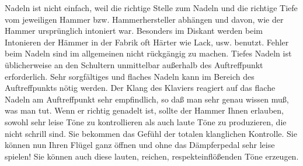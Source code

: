 %
%

Nadeln ist nicht einfach, weil die richtige Stelle zum Nadeln und die richtige Tiefe vom jeweiligen Hammer bzw. Hammerhersteller abhängen und davon, wie der Hammer ursprünglich intoniert war.
Besonders im Diskant werden beim Intonieren der Hämmer in der Fabrik oft Härter wie Lack, usw. benutzt.
Fehler beim Nadeln sind im allgemeinen nicht rückgängig zu machen.
Tiefes Nadeln ist üblicherweise an den Schultern unmittelbar außerhalb des Auftreffpunkt erforderlich.
Sehr sorgfältiges und flaches Nadeln kann im Bereich des Auftreffpunkts nötig werden.
Der Klang des Klaviers reagiert auf das flache Nadeln am Auftreffpunkt sehr empfindlich, so daß man sehr genau wissen muß, was man tut.
Wenn er richtig genadelt ist, sollte der Hammer Ihnen erlauben, sowohl sehr leise Töne zu kontrollieren als auch laute Töne zu produzieren, die nicht schrill sind.
Sie bekommen das Gefühl der totalen klanglichen Kontrolle.
Sie können nun Ihren Flügel ganz öffnen und ohne das Dämpferpedal sehr leise spielen!
Sie können auch diese lauten, reichen, respekteinflößenden Töne erzeugen.
 

